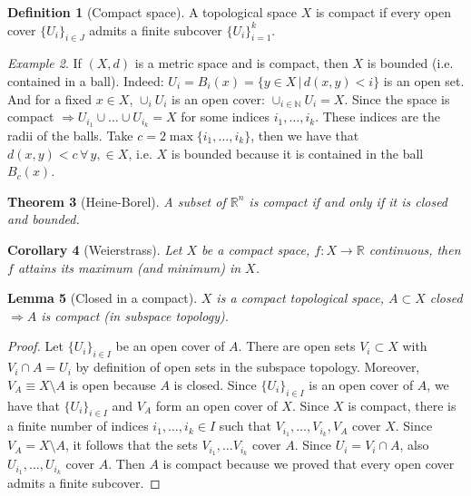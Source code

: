 \documentclass[a4paper,11pt,titlepage, article, oneside]{memoir}
\numberwithin{equation}{section}
\newtheorem{theorem}{Theorem}[section]
\newtheorem{corollary}[theorem]{Corollary}
\newtheorem{lemma}[theorem]{Lemma}
\theoremstyle{definition}
\newtheorem{definition}[theorem]{Definition}
\theoremstyle{remark}
\newtheorem{example}[theorem]{Example}
\newcommand{\rfield}{\mathbb{R}}
\begin{document}
\begin{definition} [Compact space]
A topological space $X$ is compact if every open cover $\{U_i\}_{i \in J}$ admits a finite subcover $\{U_i\}_{i=1}^k$.
\end{definition}

\begin{tcolorbox}
\begin{example}
If $(X, d)$ is a metric space and is compact, then $X$ is bounded (i.e. contained in a ball). Indeed: $U_i = B_i(x) = \{y \in X\, |\, d(x, y) < i\}$ is an open set. And for a fixed $x \in X$, $\cup_i U_i$ is an open cover: $\cup_{i \in \mathbb{N}} U_i = X$. Since the space is compact $\Rightarrow U_{i_1} \cup \ldots \cup U_{i_k} = X$ for some indices $i_1, \ldots, i_k$. These indices are the radii of the balls. Take $c = 2 \max\{i_1, \ldots, i_k\}$, then we have that $d(x, y) < c \, \forall\, y, \in X$, i.e. $X$ is bounded because it is contained in the ball $B_c(x)$.
\end{example}
\end{tcolorbox}

\begin{theorem}[Heine-Borel]
A subset of $\rfield^n$ is compact if and only if it is closed and bounded.
\end{theorem}

\begin{corollary} [Weierstrass]
Let $X$ be a compact space, $f \colon X \rightarrow \rfield$ continuous, then $f$ attains its maximum (and minimum) in $X$.
\end{corollary}

\begin{lemma}[Closed in a compact] \label{closedincomp}
$X$ is a compact topological space, $A \subset X$ closed $\Rightarrow A$ is compact (in subspace topology).
\end{lemma}
\begin{proof}
Let $\{U_i\}_{i \in I}$ be an open cover of $A$. There are open sets $V_i \subset X$ with $V_i \cap A = U_i$ by definition of open sets in the subspace topology. Moreover, $V_A \equiv X \setminus A$ is open because $A$ is closed. Since $\{U_i\}_{i \in I}$ is an open cover of $A$, we have that $\{U_i\}_{i \in I}$ and $V_A$ form an open cover of $X$. Since $X$ is compact, there is a finite number of indices $i_1, \ldots, i_k \in I$ such that $V_{i_1}, \ldots, V_{i_k}, V_A$ cover $X$. Since $V_A = X \setminus A$, it follows that the sets $V_{i_1}, \ldots V_{i_k}$ cover $A$. Since $U_i = V_i \cap A$, also $U_{i_1}, \ldots, U_{i_k}$ cover $A$. Then $A$ is compact because we proved that every open cover admits a finite subcover.
\end{proof}
\end{document}
